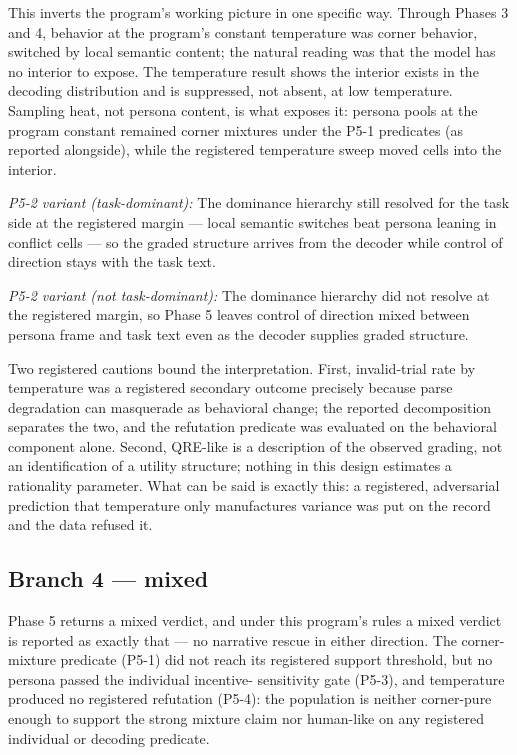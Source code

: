 \documentclass[11pt]{article}
\begin{document}
This inverts the program's working picture in one specific way. Through
Phases 3 and 4, behavior at the program's constant temperature was
corner behavior, switched by local semantic content; the natural reading
was that the model has no interior to expose. The temperature result
shows the interior exists in the decoding distribution and is
suppressed, not absent, at low temperature. Sampling heat, not persona
content, is what exposes it: persona pools at the program constant
remained corner mixtures under the P5-1 predicates (as reported
alongside), while the registered temperature sweep moved cells into the
interior.

\emph{P5-2 variant (task-dominant):} The dominance hierarchy still
resolved for the task side at the registered margin --- local semantic
switches beat persona leaning in conflict cells --- so the graded
structure arrives from the decoder while control of direction stays with
the task text.

\emph{P5-2 variant (not task-dominant):} The dominance hierarchy did not
resolve at the registered margin, so Phase 5 leaves control of direction
mixed between persona frame and task text even as the decoder supplies
graded structure.

Two registered cautions bound the interpretation. First, invalid-trial
rate by temperature was a registered secondary outcome precisely because
parse degradation can masquerade as behavioral change; the reported
decomposition separates the two, and the refutation predicate was
evaluated on the behavioral component alone. Second, QRE-like is a
description of the observed grading, not an identification of a utility
structure; nothing in this design estimates a rationality parameter.
What can be said is exactly this: a registered, adversarial prediction
that temperature only manufactures variance was put on the record and
the data refused it.

\subsection{Branch 4 --- mixed}\label{branch-4-mixed}

Phase 5 returns a mixed verdict, and under this program's rules a mixed
verdict is reported as exactly that --- no narrative rescue in either
direction. The corner-mixture predicate (P5-1) did not reach its
registered support threshold, but no persona passed the individual
incentive- sensitivity gate (P5-3), and temperature produced no
registered refutation (P5-4): the population is neither corner-pure
enough to support the strong mixture claim nor human-like on any
registered individual or decoding predicate.
\end{document}
